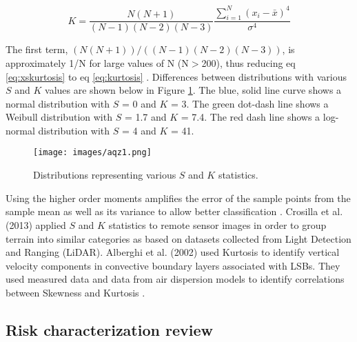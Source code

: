 \begin{equation}
\label{eq:xskurtosis}
K = \frac{N(N+1)}{(N-1)(N-2)(N-3)} \frac{\sum_{i=1}^{N}\left (x_{i}-\bar{x} \right )^{4}}{\sigma^{4}}
\end{equation}

The first term, $(N(N+1))/((N-1)(N-2)(N-3))$, is approximately 1/N for large values of N (N$>$200), thus reducing eq \ref{eq:xskurtosis} to eq \ref{eq:kurtosis} \citep{Cox2010}.  Differences between distributions with various $S$ and $K$ values are shown below in Figure \ref{fig:SKcurves}.  The blue, solid line curve shows a normal distribution with $S$ = 0 and $K$ = 3. The green dot-dash line shows a Weibull distribution with $S$ = 1.7 and $K$ = 7.4.  The red dash line shows a log-normal distribution with $S$ = 4 and $K$ = 41. 
%
\begin{figure}
\texttt{[image: images/aqz1.png]} 
\caption{Distributions representing various $S$ and $K$ statistics.}
\label{fig:SKcurves}
\end{figure}
%
Using the higher order moments amplifies the error of the sample points from the sample mean as well as its variance to allow better classification \citep{Seo2011}.  Crosilla et al. (2013) applied $S$ and $K$ statistics to remote sensor images in order to group terrain into similar categories as based on datasets collected from Light Detection and Ranging (LiDAR).  Alberghi et al. (2002) used Kurtosis to identify vertical velocity components in convective boundary layers associated with LSBs.  They used measured data and data from air dispersion models to identify correlations between Skewness and Kurtosis \citep{Alberghi2002}.
\clearpage
\subsection{Risk characterization review}


